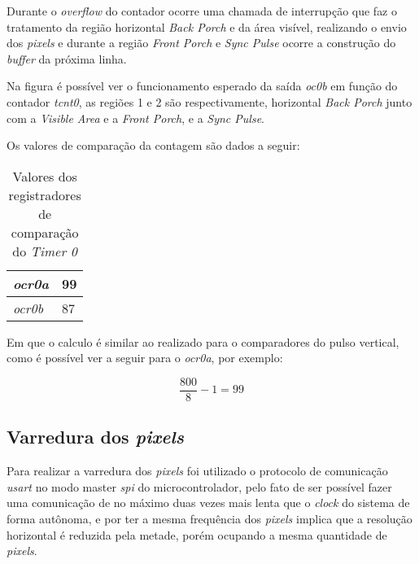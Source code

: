 \documentclass[twocolumn]{article}
\begin{document}
        Durante o \textsl{overflow} do contador ocorre uma chamada de interrupção que faz o tratamento da região horizontal \textsl{Back Porch} e da área visível, realizando o envio dos \textsl{pixels} e durante a região \textsl{Front Porch} e \textsl{Sync Pulse} ocorre a construção do \textsl{buffer} da próxima linha.
        
        

        Na figura é possível ver o funcionamento esperado da saída \textsl{oc0b} em função do contador \textsl{tcnt0}, as regiões 1 e 2 são respectivamente, horizontal \textsl{Back Porch} junto com a \textsl{Visible Area} e a \textsl{Front Porch}, e a \textsl{Sync Pulse}.

        Os valores de comparação da contagem são dados a seguir:
        
        \begin{table}[H]
            \centering
            \begin{tabular}{l l}        \hline
                \textsl{ocr0a}  & 99 \\ \hline
                \textsl{ocr0b}  & 87 \\ \hline
            \end{tabular}
            \caption{Valores dos registradores de comparação do \textsl{Timer 0}}
            \label{tab:val_timer_0}
        \end{table}

        Em que o calculo é similar ao realizado para o comparadores do pulso vertical, como é possível ver a seguir para o \textsl{ocr0a}, por exemplo:
    
        \begin{equation}
             \frac{800}{8} - 1 = 99
        \end{equation}

    \subsection{Varredura dos \textsl{pixels}}
        Para realizar a varredura dos \textsl{pixels} foi utilizado o protocolo de comunicação \textsl{usart} no modo master \textsl{spi} do microcontrolador, pelo fato de ser possível fazer uma comunicação de no máximo duas vezes mais lenta que o \textsl{clock} do sistema de forma autônoma, e por ter a mesma frequência dos \textsl{pixels} implica que a resolução horizontal é reduzida pela metade, porém ocupando a mesma quantidade de \textsl{pixels}.
        
\end{document}
